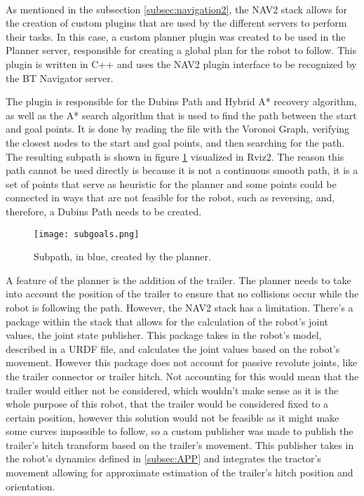 \paragraph{}As mentioned in the subsection \ref{subsec:navigation2}, the \gls{NAV2} stack allows for the creation of custom plugins that are 
used by the different servers to perform their tasks. In this case, a custom planner plugin was 
created to be used in the Planner server, responsible for creating a global plan 
for the robot to follow. This plugin is written in C++ and uses the 
\gls{NAV2} plugin interface to be recognized by the BT Navigator server.

The plugin is responsible for the Dubins Path and Hybrid A* recovery algorithm, 
as well as the A* search algorithm that is used to find the path between the start and goal points. It is done 
by reading the file with the Voronoi Graph, verifying the closest nodes to the 
start and goal points, and then searching for the path. The resulting subpath is 
shown in figure \ref{fig:subgoals} visualized in Rviz2.
The reason this path cannot be used directly is because it is not a continuous 
smooth path, it is a set of points that serve as heuristic for the planner and 
some points could be connected in ways that are not feasible for the robot, such as reversing, and, therefore, 
a Dubins Path needs to be created.
\begin{figure}[h]
    \centering
    \texttt{[image: subgoals.png]}
    \caption{Subpath, in blue, created by the planner.}
    \label{fig:subgoals}
\end{figure}

A feature of the planner is the addition of the trailer. The planner needs to take into account 
the position of the trailer to ensure that no collisions occur while the robot is 
following the path. However, the \gls{NAV2} stack has a limitation. There's a package 
within the stack that allows for the calculation of the robot's joint values, the joint state 
publisher. This package takes in the robot's model, described in a \gls{URDF} file, and calculates the joint values 
based on the robot's movement. However this package does not account for passive revolute joints, like 
the trailer connector or trailer hitch. Not accounting for this would mean 
that the trailer would either not be considered, which wouldn't make sense 
as it is the whole purpose of this robot, that the trailer would be considered 
fixed to a certain position, however this solution would not be feasible as it might make 
some curves impossible to follow, so a custom publisher was made to publish the trailer's hitch 
transform based on the trailer's movement. This publisher takes in the robot's 
dynamics defined in \ref{subsec:APP} and integrates the tractor's movement 
allowing for approximate estimation of the trailer's hitch position and orientation.


